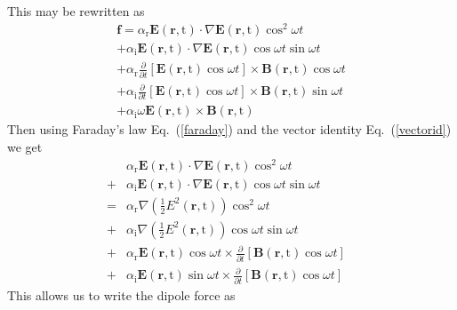 \documentclass[twocolumn,english,pra,aps,superscriptaddress,floatfix]{revtex4-1}
\begin{document}
This may be rewritten as 
\begin{align}
&\mathbf{f}=\alpha_{\mathrm{r}}\mathbf{E}(\mathbf{r},\mathrm{t})\cdot\nabla\mathbf{E}(\mathbf{r},\mathrm{t})\cos^2{\omega t}& \nonumber \\
&+\alpha_{\mathrm{i}}\mathbf{E}(\mathbf{r},\mathrm{t})\cdot\nabla\mathbf{E}(\mathbf{r},\mathrm{t})\cos{\omega t}\sin{\omega t}& \nonumber \\
&+
\alpha_{\mathrm{r}}\frac{\partial}{\partial t}\left[\mathbf{E}(\mathbf{r},\mathrm{t})\cos{\omega t}\right]\times\mathbf{B}(\mathbf{r},\mathrm{t})\cos{\omega t}& \nonumber \\
&+
\alpha_{\mathrm{i}}\frac{\partial}{\partial t}\left[\mathbf{E}(\mathbf{r},\mathrm{t})\cos{\omega t}\right]\times\mathbf{B}(\mathbf{r},\mathrm{t})\sin{\omega t}& \nonumber \\
&+\alpha_{\mathrm{i}}\omega\mathbf{E}(\mathbf{r},\mathrm{t})\times\mathbf{B}(\mathbf{r},\mathrm{t})&
\end{align}
Then using Faraday's law Eq.\ (\ref{faraday}) and the vector identity Eq.\ (\ref{vectorid}) we get
\begin{align}
&\alpha_{\mathrm{r}}\mathbf{E}(\mathbf{r},\mathrm{t})\cdot\nabla\mathbf{E}(\mathbf{r},\mathrm{t})\cos^2{\omega t}& \nonumber \\
+ &\alpha_{\mathrm{i}}\mathbf{E}(\mathbf{r},\mathrm{t})\cdot\nabla\mathbf{E}(\mathbf{r},\mathrm{t})\cos{\omega t}\sin{\omega t}& \nonumber \\
= &\alpha_{\mathrm{r}}\nabla\left(\frac{1}{2}E^2(\mathbf{r},\mathrm{t})\right)\cos^2{\omega t}& \nonumber \\
+&\alpha_{\mathrm{i}}\nabla\left(\frac{1}{2}E^2(\mathbf{r},\mathrm{t})\right)\cos{\omega t}\sin{\omega t}& \nonumber \\
+&\alpha_{\mathrm{r}}\mathbf{E}(\mathbf{r},\mathrm{t})\cos{\omega t}\times\frac{\partial}{\partial t}\left[\mathbf{B}(\mathbf{r},\mathrm{t})\cos{\omega t}\right]& \nonumber \\
+&\alpha_{\mathrm{i}}\mathbf{E}(\mathbf{r},\mathrm{t})\sin{\omega t}\times\frac{\partial}{\partial t}\left[\mathbf{B}(\mathbf{r},\mathrm{t})\cos{\omega t}\right]&
\end{align}
This allows us to write the dipole force as
\end{document}
